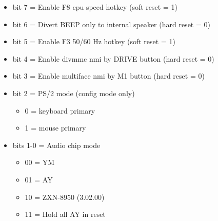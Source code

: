 \begin{itemize}
\item bit 7 = Enable F8 cpu speed hotkey (soft reset = 1)
\item bit 6 = Divert BEEP only to internal speaker (hard reset = 0)
\item bit 5 = Enable F3 50/60 Hz hotkey (soft reset = 1)
\item bit 4 = Enable divmmc nmi by DRIVE button (hard reset = 0)
\item bit 3 = Enable multiface nmi by M1 button (hard reset = 0)
\item bit 2 = PS/2 mode (config mode only)
\begin{itemize}
\item 0 = keyboard primary
\item 1 = mouse primary
\end{itemize}
\item bits 1-0 = Audio chip mode
\begin{itemize}
\item 00 = YM
\item 01 = AY
\item 10 = ZXN-8950 (3.02.00)
\item 11 = Hold all AY in reset
\end{itemize}
\end{itemize}

